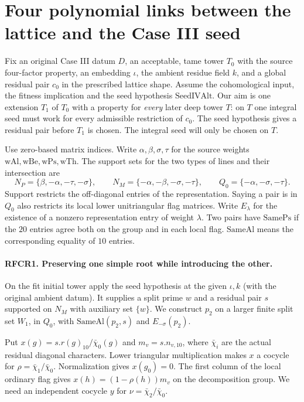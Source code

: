\section{Four polynomial links between the lattice and the Case III seed}

Fix an original Case III datum $D$, an acceptable, tame tower $T_0$
with the source four-factor property, an embedding $\iota$, the ambient
residue field $k$, and a global residual pair $c_0$ in the prescribed
lattice shape. Assume the cohomological input, the fitness implication
and the seed hypothesis $\mathrm{SeedIVAlt}$. Our aim is one extension
$T_1$ of $T_0$ with a property for \emph{every} later deep tower $T$:
on $T$ one integral seed must work for every admissible restriction of
$c_0$. The seed hypothesis gives a residual pair before $T_1$ is
chosen. The integral seed will only be chosen on $T$.

Use zero-based matrix indices. Write $\alpha,\beta,\sigma,\tau$ for
the source weights $\mathrm{wAl},\mathrm{wBe},\mathrm{wPs},\mathrm{wTh}$.
The support sets for the two types of lines and their intersection are
\[
 N_P=\{\beta,-\alpha,-\tau,-\sigma\},\qquad
 N_M=\{-\alpha,-\beta,-\sigma,-\tau\},\qquad
 Q_0=\{-\alpha,-\sigma,-\tau\}.
\]
Support restricts the off-diagonal entries of the representation.
Saying a pair is in $Q_0$ also restricts its local lower unitriangular
flag matrices. Write $E_\lambda$ for the existence of a nonzero
representation entry of weight $\lambda$. Two pairs have
$\mathrm{SamePs}$ if the $20$ entries agree both on the group and in
each local flag. $\mathrm{SameAl}$ means the corresponding equality of
$10$ entries.

\paragraph{RFCR1. Preserving one simple root while introducing the other.}
On the fit initial tower apply the seed hypothesis at the given
$\iota,k$ (with the original ambient datum). It supplies a split prime
$w$ and a residual pair $s$ supported on $N_M$ with auxiliary set
$\{w\}$. We construct $p_2$ on a larger finite split set $W_1$, in
$Q_0$, with $\mathrm{SameAl}(p_2,s)$ and $E_{-\sigma}(p_2)$.

Put $x(g)=s.r(g)_{10}/\bar\chi_0(g)$ and $m_v=s.n_{v,10}$, where
$\bar\chi_i$ are the actual residual diagonal characters. Lower
triangular multiplication makes $x$ a cocycle for
$\rho=\bar\chi_1/\bar\chi_0$. Normalization gives $x(g_0)=0$.
The first column of the local ordinary flag gives
$x(h)=(1-\rho(h))m_v$ on the decomposition group. We need an
independent cocycle $y$ for $\nu=\bar\chi_2/\bar\chi_0$.

